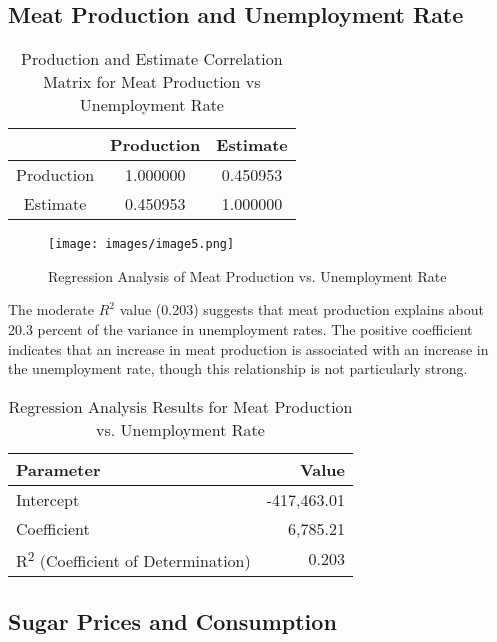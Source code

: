 \documentclass[letterpaper, 11pt]{report}
\begin{document}


\subsection{Meat Production and Unemployment Rate}

\begin{table}[h!]
\centering
\begin{tabular}{|c|c|c|}
\hline
          & Production & Estimate  \\ \hline
Production & 1.000000   & 0.450953  \\ \hline
Estimate   & 0.450953   & 1.000000  \\ \hline
\end{tabular}
\caption{Production and Estimate Correlation Matrix for Meat Production vs Unemployment Rate}
\label{table:correlation}
\end{table}

\begin{figure}[h!]
    \centering
    \texttt{[image: images/image5.png]}
    \caption{Regression Analysis of Meat Production vs. Unemployment Rate }
    \label{fig:employees}
\end{figure}

The moderate $R^2$ value (0.203) suggests that meat production explains about 20.3 percent of the variance in unemployment rates. The positive coefficient indicates that an increase in meat production is associated with an increase in the unemployment rate, though this relationship is not particularly strong.

\begin{table}[h!]
\centering
\begin{tabular}{|l|r|}
\hline
Parameter                           & Value        \\ \hline
Intercept                           & -417,463.01  \\ \hline
Coefficient                         & 6,785.21     \\ \hline
R\textsuperscript{2} (Coefficient of Determination) & 0.203        \\ \hline
\end{tabular}
\caption{Regression Analysis Results for Meat Production vs. Unemployment Rate}
\label{table:regression}
\end{table}


\subsection{Sugar Prices and Consumption}
\end{document}
